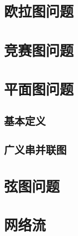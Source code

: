 \documentclass[12pt,a4paper]{article}
\begin{document}
\newpage
\section{欧拉图问题}

\newpage
\section{竞赛图问题} %

\newpage
\section{平面图问题}
\subsection{基本定义}
\subsection{广义串并联图}

\newpage
\section{弦图问题} %

\newpage
\section{网络流}
\end{document}
